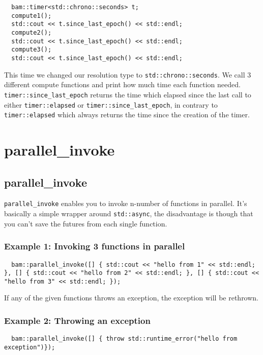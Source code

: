 \documentclass[11pt, a4paper]{article}
\begin{document}
\begin{lstlisting}
  bam::timer<std::chrono::seconds> t;
  compute1();
  std::cout << t.since_last_epoch() << std::endl;
  compute2();
  std::cout << t.since_last_epoch() << std::endl;
  compute3();
  std::cout << t.since_last_epoch() << std::endl;
\end{lstlisting}

This time we changed our resolution type to \texttt{std::chrono::seconds}. We call 3 different compute functions and print how much time each function needed. \texttt{timer::since\_last\_epoch} returns the time which elapsed since the last call to either \texttt{timer::elapsed} or \texttt{timer::since\_last\_epoch}, in contrary to \texttt{timer::elapsed} which always returns the time since the creation of the timer.


\section{parallel\_invoke}
\subsection{parallel\_invoke}

\texttt{parallel\_invoke} enables you to invoke n-number of functions in parallel. It's basically a simple wrapper around \texttt{std::async}, the disadvantage is though that you can't save the futures from each single function.

\subsubsection{Example 1: Invoking 3 functions in parallel}

\begin{lstlisting}
  bam::parallel_invoke([] { std::cout << "hello from 1" << std::endl; }, [] { std::cout << "hello from 2" << std::endl; }, [] { std::cout << "hello from 3" << std::endl; });
\end{lstlisting}

If any of the given functions throws an exception, the exception will be rethrown.

\subsubsection{Example 2: Throwing an exception}

\begin{lstlisting}
  bam::parallel_invoke([] { throw std::runtime_error("hello from exception")});
\end{lstlisting}
\end{document}
